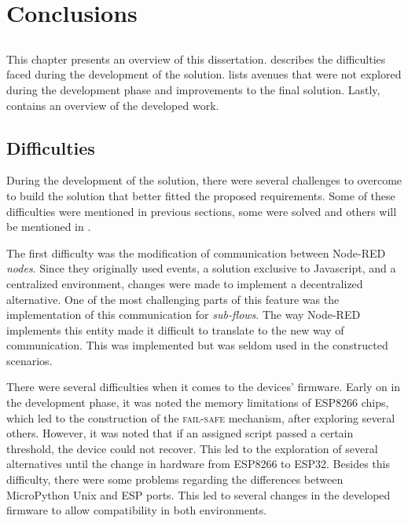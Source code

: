 \chapter{Conclusions} \label{chap:concl}

\section*{}

\minitoc \mtcskip \noindent
This chapter presents an overview of this dissertation.  describes the difficulties faced during the development of the solution.  lists avenues that were not explored during the development phase and improvements to the final solution. Lastly,  contains an overview of the developed work.

\section{Difficulties}\label{sec:difficulties}

During the development of the solution, there were several challenges to overcome to build the solution that better fitted the proposed requirements. Some of these difficulties were mentioned in previous sections, some were solved and others will be mentioned in .

The first difficulty was the modification of communication between Node-RED \textit{nodes}. Since they originally used events, a solution exclusive to Javascript, and a centralized environment, changes were made to implement a decentralized alternative. One of the most challenging parts of this feature was the implementation of this communication for \emph{sub-flows}. The way Node-RED implements this entity made it difficult to translate to the new way of communication. This was implemented but was seldom used in the constructed scenarios.

There were several difficulties when it comes to the devices' firmware. Early on in the development phase, it was noted the memory limitations of ESP8266 chips, which led to the construction of the \textsc{fail-safe} mechanism, after exploring several others. However, it was noted that if an assigned script passed a certain threshold, the device could not recover. This led to the exploration of several alternatives until the change in hardware from ESP8266 to ESP32. Besides this difficulty, there were some problems regarding the differences between MicroPython Unix and ESP ports. This led to several changes in the developed firmware to allow compatibility in both environments. 

